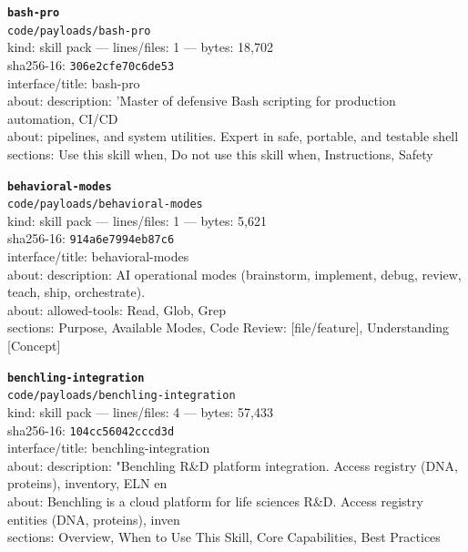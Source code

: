 \noindent\textbf{\texttt{bash-pro}}\\
\texttt{code/payloads/bash-pro}\\
kind: skill pack --- lines/files: 1 --- bytes: 18,702\\
sha256-16: \texttt{306e2cfe70c6de53}\\
interface/title: bash-pro\\
about: description: 'Master of defensive Bash scripting for production automation, CI/CD\\
about: pipelines, and system utilities. Expert in safe, portable, and testable shell\\
sections: Use this skill when, Do not use this skill when, Instructions, Safety\\
\vspace*{6.0pt}

\noindent\textbf{\texttt{behavioral-modes}}\\
\texttt{code/payloads/behavioral-modes}\\
kind: skill pack --- lines/files: 1 --- bytes: 5,621\\
sha256-16: \texttt{914a6e7994eb87c6}\\
interface/title: behavioral-modes\\
about: description: AI operational modes (brainstorm, implement, debug, review, teach, ship, orchestrate). \\
about: allowed-tools: Read, Glob, Grep\\
sections: Purpose, Available Modes, Code Review: [file/feature], Understanding [Concept]\\
\vspace*{6.0pt}
\newpage

\noindent\textbf{\texttt{benchling-integration}}\\
\texttt{code/payloads/benchling-integration}\\
kind: skill pack --- lines/files: 4 --- bytes: 57,433\\
sha256-16: \texttt{104cc56042cccd3d}\\
interface/title: benchling-integration\\
about: description: "Benchling R\&D platform integration. Access registry (DNA, proteins), inventory, ELN en\\
about: Benchling is a cloud platform for life sciences R\&D. Access registry entities (DNA, proteins), inven\\
sections: Overview, When to Use This Skill, Core Capabilities, Best Practices\\
\vspace*{6.0pt}

